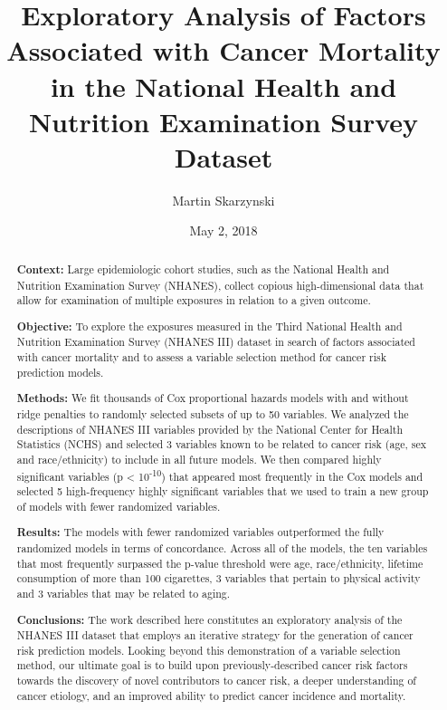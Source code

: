 \documentclass[12pt,oneside]{reedthesis}
\title{Exploratory Analysis of Factors Associated with Cancer Mortality\\
in the National Health and Nutrition Examination Survey Dataset}
\author{Martin Skarzynski}
\date{May 2, 2018}
\theoremstyle{definition}
\theoremstyle{definition}
\theoremstyle{definition}
\theoremstyle{remark}
\begin{document}
  \maketitle

\frontmatter %
\pagestyle{empty} %





  \begin{abstract}
    \textbf{Context:} Large epidemiologic cohort studies, such as the
    National Health and Nutrition Examination Survey (NHANES), collect
    copious high-dimensional data that allow for examination of multiple
    exposures in relation to a given outcome.
    
    \textbf{Objective:} To explore the exposures measured in the Third
    National Health and Nutrition Examination Survey (NHANES III) dataset in
    search of factors associated with cancer mortality and to assess a
    variable selection method for cancer risk prediction models.
    
    \textbf{Methods:} We fit thousands of Cox proportional hazards models
    with and without ridge penalties to randomly selected subsets of up to
    50 variables. We analyzed the descriptions of NHANES III variables
    provided by the National Center for Health Statistics (NCHS) and
    selected 3 variables known to be related to cancer risk (age, sex and
    race/ethnicity) to include in all future models. We then compared highly
    significant variables (p \textless{} 10\textsuperscript{-10}) that
    appeared most frequently in the Cox models and selected 5 high-frequency
    highly significant variables that we used to train a new group of models
    with fewer randomized variables.
    
    \textbf{Results:} The models with fewer randomized variables
    outperformed the fully randomized models in terms of concordance. Across
    all of the models, the ten variables that most frequently surpassed the
    p-value threshold were age, race/ethnicity, lifetime consumption of more
    than 100 cigarettes, 3 variables that pertain to physical activity and 3
    variables that may be related to aging.
    
    \textbf{Conclusions:} The work described here constitutes an exploratory
    analysis of the NHANES III dataset that employs an iterative strategy
    for the generation of cancer risk prediction models. Looking beyond this
    demonstration of a variable selection method, our ultimate goal is to
    build upon previously-described cancer risk factors towards the
    discovery of novel contributors to cancer risk, a deeper understanding
    of cancer etiology, and an improved ability to predict cancer incidence
    and mortality.
  \end{abstract}
\end{document}
